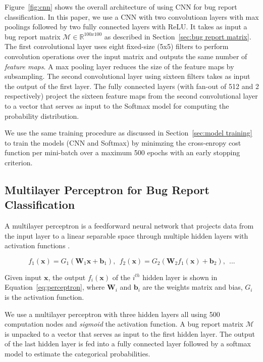 Figure~\ref{fig:cnn} shows the overall architecture of using CNN for bug report classification. In this paper, we use a CNN with two convolutioan layers with max poolings followed by two fully connected layers with ReLU. It takes as input a bug report matrix $\mathcal{M} \in \mathbb{R}^{100x100}$ as described in Section~\ref{sec:bug report matrix}. The first convolutional layer uses eight fixed-size (5x5) filters to perform convolution operations over the input matrix and outputs the same number of \textit{feature maps}. A max pooling layer reduces the size of the feature maps by subsampling. The second convolutional layer using sixteen filters takes as input the output of the first layer. The fully connected layers (with fan-out of 512 and 2 respectively) project the sixteen feature maps from the second convolutional layer to a vector that serves as input to the Softmax model for computing the probability distribution.

We use the same training procedure as discussed in Section~\ref{sec:model training} to train the models (CNN and Softmax) by minimzing the cross-enropy cost function per mini-batch over a maximum 500 epochs with an early stopping criterion. 

\subsection{Multilayer Perceptron for Bug Report Classification}
\label{sec:perceptron}
A multilayer perceptron is a feedforward neural network that projects data from the input layer to a linear separable space through multiple hidden layers with activation functions \cite{Hornik:1989:MFN:70405.70408}.

\begin{equation}
  f_1(\mathbf{x}) = G_1(\mathbf{W}_1\mathbf{x} + \mathbf{b}_1), \:\: f_2(\mathbf{x}) = G_2(\mathbf{W}_2 f_1(\mathbf{x}) + \mathbf{b}_2), \:\: ...
\label{eq:perceptron}
\end{equation}

Given input $\mathbf{x}$, the output $f_i(\mathbf{x})$ of the $i^{th}$ hidden layer is shown in Equation~\ref{eq:perceptron}, where $\mathbf{W}_i$ and $\mathbf{b}_i$ are the weights matrix and bias, $G_i$ is the activation function.

We use a multilayer perceptron with three hidden layers all using 500 computation nodes and \textit{sigmoid} the activation function. A bug report matrix $\mathcal{M}$ is unpacked to a vector that serves as input to the first hidden layer. The output of the last hidden layer is fed into a fully connected layer followed by a softmax model to estimate the categorical probabilities.

